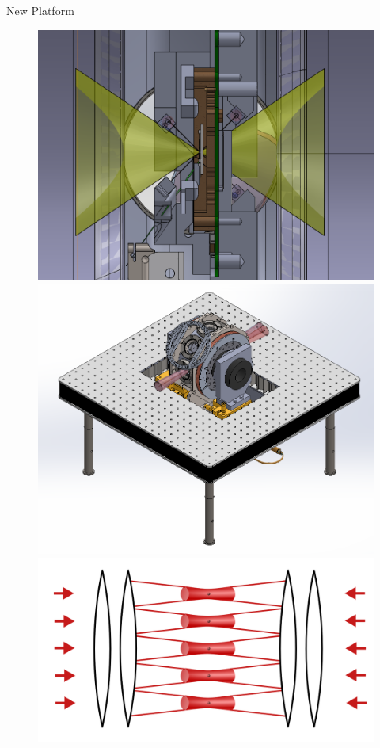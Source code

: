 \documentclass[final]{beamer}
\begin{document}
\begin{frame}{}
\begin{center}
\begin{columns}[t]
\begin{column}{0.49\textwidth}
\begin{alertblock}{New Platform}
      \begin{figure}
        \includegraphics[height=0.35\textwidth]{./figs/trap_NA.png}
        \includegraphics[height=0.35\textwidth]{./figs/exp_iso.png}
        \includegraphics[height=0.35\textwidth]{./figs/array_sw.png}
      \end{figure}

    \end{alertblock}

  \end{column}
\end{columns}
\end{center}

\end{frame}
\end{document}
